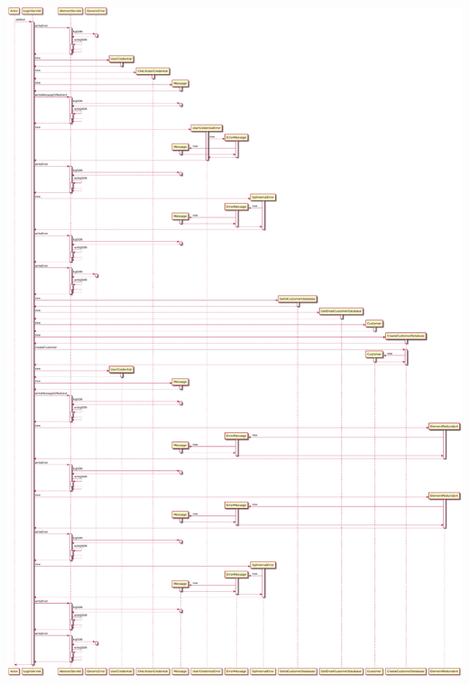 \includegraphics[width=\textwidth,height=\textheight,keepaspectratio]{Schemas/LoginServlet_doPost.svg.pdf}

